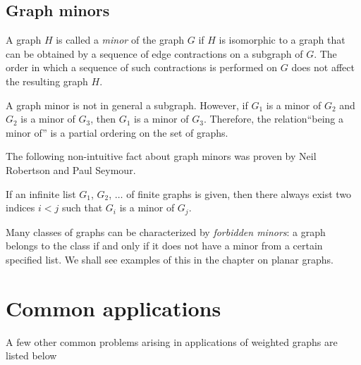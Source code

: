 \subsection{Graph minors}

A graph $H$ is called a {\it minor} of the graph $G$ if $H$ is isomorphic to a
graph that can be obtained by a sequence of edge contractions on a
subgraph of $G$.  The order in which a sequence of such contractions is
performed on $G$ does not affect the resulting graph $H$.

A graph minor is not in general a subgraph.
However, if $G_1$
is a minor of $G_2$ and $G_2$ is a minor of $G_3$, then $G_1$ is a minor of $G_3$.
Therefore, the relation``being a minor of'' is a partial ordering on
the set of graphs.

The following non-intuitive fact about graph minors was proven by
Neil Robertson and Paul Seymour.

\begin{theorem}
{\rm
If an infinite list $G_1$, $G_2$, $\dots$ of finite graphs is given, then there always exist two indices
$i < j$ such that $G_i$ is a minor of $G_j$.
}
\end{theorem}

Many classes of graphs can be characterized by {\it forbidden minors}: a
graph belongs to the class if and only if it does not have a minor
from a certain specified list.
We shall see examples of this in the chapter on planar graphs.


\section{Common applications}

A few other common problems arising in applications of weighted graphs
are listed below


